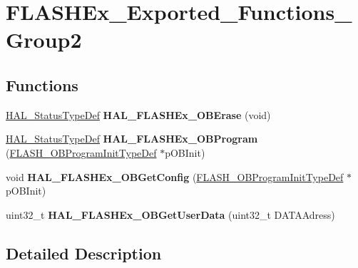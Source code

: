 \hypertarget{group___f_l_a_s_h_ex___exported___functions___group2}{}\section{F\+L\+A\+S\+H\+Ex\+\_\+\+Exported\+\_\+\+Functions\+\_\+\+Group2}
\label{group___f_l_a_s_h_ex___exported___functions___group2}
\subsection*{Functions}
\begin{DoxyCompactItemize}
\item 
\mbox{\label{group___f_l_a_s_h_ex___exported___functions___group2_ga74d4265b88afed50efe9fda0f025979a}} 
\hyperlink{stm32f0xx__hal__def_8h_a63c0679d1cb8b8c684fbb0632743478f}{H\+A\+L\+\_\+\+Status\+Type\+Def} {\bfseries H\+A\+L\+\_\+\+F\+L\+A\+S\+H\+Ex\+\_\+\+O\+B\+Erase} (void)
\item 
\mbox{\label{group___f_l_a_s_h_ex___exported___functions___group2_ga001dd4a8defa9eb24a17c4df5953a41d}} 
\hyperlink{stm32f0xx__hal__def_8h_a63c0679d1cb8b8c684fbb0632743478f}{H\+A\+L\+\_\+\+Status\+Type\+Def} {\bfseries H\+A\+L\+\_\+\+F\+L\+A\+S\+H\+Ex\+\_\+\+O\+B\+Program} (\hyperlink{struct_f_l_a_s_h___o_b_program_init_type_def}{F\+L\+A\+S\+H\+\_\+\+O\+B\+Program\+Init\+Type\+Def} $\ast$p\+O\+B\+Init)
\item 
\mbox{\label{group___f_l_a_s_h_ex___exported___functions___group2_ga6d45d5442b8147533b1100ec40fe75d7}} 
void {\bfseries H\+A\+L\+\_\+\+F\+L\+A\+S\+H\+Ex\+\_\+\+O\+B\+Get\+Config} (\hyperlink{struct_f_l_a_s_h___o_b_program_init_type_def}{F\+L\+A\+S\+H\+\_\+\+O\+B\+Program\+Init\+Type\+Def} $\ast$p\+O\+B\+Init)
\item 
\mbox{\label{group___f_l_a_s_h_ex___exported___functions___group2_ga683593291451ae3e0dd1a6426ba72b3a}} 
uint32\+\_\+t {\bfseries H\+A\+L\+\_\+\+F\+L\+A\+S\+H\+Ex\+\_\+\+O\+B\+Get\+User\+Data} (uint32\+\_\+t D\+A\+T\+A\+Adress)
\end{DoxyCompactItemize}


\subsection{Detailed Description}
